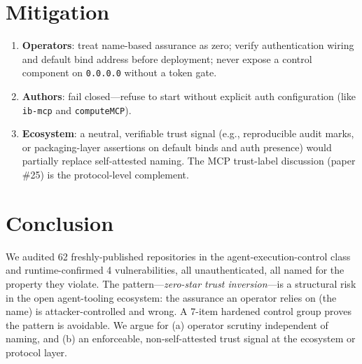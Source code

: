 \documentclass{llncs}
\begin{document}
\section{Mitigation}\label{sec:mitigation}
\begin{enumerate}
\item \textbf{Operators}: treat name-based assurance as zero; verify authentication wiring and default bind address before deployment; never expose a control component on \texttt{0.0.0.0} without a token gate.
\item \textbf{Authors}: fail closed---refuse to start without explicit auth configuration (like \texttt{ib-mcp} and \texttt{computeMCP}).
\item \textbf{Ecosystem}: a neutral, verifiable trust signal (e.g., reproducible audit marks, or packaging-layer assertions on default binds and auth presence) would partially replace self-attested naming. The MCP trust-label discussion (paper \#25) is the protocol-level complement.
\end{enumerate}

\section{Conclusion}\label{sec:conclusion}
We audited 62 freshly-published repositories in the agent-execution-control class and runtime-confirmed 4 vulnerabilities, all unauthenticated, all named for the property they violate. The pattern---\emph{zero-star trust inversion}---is a structural risk in the open agent-tooling ecosystem: the assurance an operator relies on (the name) is attacker-controlled and wrong. A 7-item hardened control group proves the pattern is avoidable. We argue for (a) operator scrutiny independent of naming, and (b) an enforceable, non-self-attested trust signal at the ecosystem or protocol layer.



\end{document}
